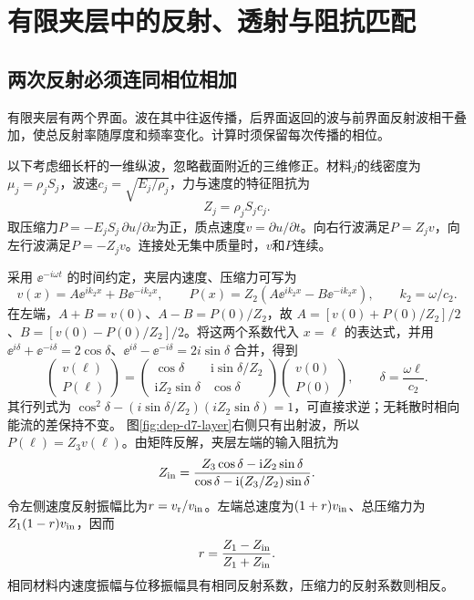 \section{有限夹层中的反射、透射与阻抗匹配}
\subsection{两次反射必须连同相位相加}
有限夹层有两个界面。波在其中往返传播，后界面返回的波与前界面反射波相干叠加，使总反射率随厚度和频率变化。计算时须保留每次传播的相位。

以下考虑细长杆的一维纵波，忽略截面附近的三维修正。材料$j$的线密度为$\mu_j=\rho_jS_j$，波速$c_j=\sqrt{E_j/\rho_j}$，力与速度的特征阻抗为
\[
 Z_j=\rho_jS_jc_j.
\]
取压缩力$P=-E_jS_j\,\partial u/\partial x$为正，质点速度$v=\partial u/\partial t$。向右行波满足$P=Z_jv$，向左行波满足$P=-Z_jv$。连接处无集中质量时，$v$和$P$连续。

采用 $\ee^{-i\omega t}$ 的时间约定，夹层内速度、压缩力可写为
\[
v(x)=A\ee^{ik_2x}+B\ee^{-ik_2x},\qquad
P(x)=Z_2(A\ee^{ik_2x}-B\ee^{-ik_2x}),\qquad k_2=\omega/c_2.
\]
在左端，$A+B=v(0)$、$A-B=P(0)/Z_2$，故 $A=[v(0)+P(0)/Z_2]/2$、$B=[v(0)-P(0)/Z_2]/2$。将这两个系数代入 $x=\ell$ 的表达式，并用 $\ee^{i\delta}+\ee^{-i\delta}=2\cos\delta$、$\ee^{i\delta}-\ee^{-i\delta}=2i\sin\delta$ 合并，得到
\[
 \begin{pmatrix}v(\ell)\\P(\ell)\end{pmatrix}
 =
 \begin{pmatrix}
 \cos\delta&\mathrm i\sin\delta/Z_2\\
 \mathrm i Z_2\sin\delta&\cos\delta
 \end{pmatrix}
 \begin{pmatrix}v(0)\\P(0)\end{pmatrix},
 \qquad\delta=\frac{\omega\ell}{c_2}.
\]
其行列式为 $\cos^2\delta-(i\sin\delta/Z_2)(iZ_2\sin\delta)=1$，可直接求逆；无耗散时相向能流的差保持不变。
图\ref{fig:dep-d7-layer}右侧只有出射波，所以$P(\ell)=Z_3v(\ell)$。由矩阵反解，夹层左端的输入阻抗为
\[
 Z_{\rm in}=
 \frac{Z_3\cos\delta-\mathrm iZ_2\sin\delta}
 {\cos\delta-\mathrm i(Z_3/Z_2)\sin\delta}.
\]
令左侧速度反射振幅比为$r=v_{\rm r}/v_{\rm in}$。左端总速度为$(1+r)v_{\rm in}$、总压缩力为$Z_1(1-r)v_{\rm in}$，因而
\[
 r=\frac{Z_1-Z_{\rm in}}{Z_1+Z_{\rm in}}.
\]
相同材料内速度振幅与位移振幅具有相同反射系数，压缩力的反射系数则相反。

